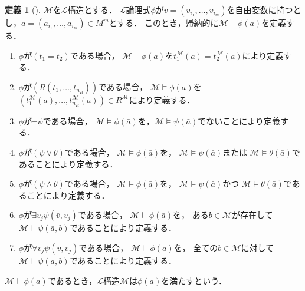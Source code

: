 \documentclass[uplatex, dvipdfmx]{jsarticle}
\numberwithin{equation}{section}
\theoremstyle{definition}
\newtheorem{definition}{定義}[section]
\begin{document}
\begin{definition}[{\cite[Definition 1.1.6]{MR1924282}}]
     $\mathcal{M}$を$\mathcal{L}$構造とする．
     $\mathcal{L}$論理式$\phi$が$\bar{v} = (v_{i_1}, \dots, v_{i_m})$を自由変数に持つとし，$\bar{a} = (a_{i_1}, \dots, a_{i_m}) \in M^m$とする．
     このとき，帰納的に$\mathcal{M} \models \phi(\bar{a})$を定義する．
     \begin{enumerate}
          \item 
               $\phi$が$(t_1=t_2)$である場合，
               $\mathcal{M} \models \phi(\bar{a})$を$t_1^\mathcal{M}(\bar{a}) = t_2^\mathcal{M}(\bar{a})$により定義する．
          \item 
               $\phi$が$(R(t_1, \dots, t_{n_R}))$である場合，
               $\mathcal{M} \models \phi(\bar{a})$を$(t_1^\mathcal{M}(\bar{a}), \dots, t_{n_R}^\mathcal{M}(\bar{a}))\in R^\mathcal{M}$により定義する．
          \item
               $\phi$が$\lnot \psi$である場合，
               $\mathcal{M} \models \phi(\bar{a})$を，$\mathcal{M} \models \psi(\bar{a})$でないことにより定義する．
          \item
               $\phi$が$(\psi \lor \theta)$である場合，
               $\mathcal{M} \models \phi(\bar{a})$を，
               $\mathcal{M} \models \psi(\bar{a})$または
               $\mathcal{M} \models \theta(\bar{a})$であることにより定義する．
          \item
               $\phi$が$(\psi \land \theta)$である場合，
               $\mathcal{M} \models \phi(\bar{a})$を，
               $\mathcal{M} \models \psi(\bar{a})$かつ
               $\mathcal{M} \models \theta(\bar{a})$であることにより定義する．
          \item
               $\phi$が$\exists v_j\psi(\bar{v}, v_j)$である場合，
               $\mathcal{M} \models \phi(\bar{a})$を，
               ある$b \in \mathcal{M}$が存在して
               $\mathcal{M} \models \psi(\bar{a},b)$であることにより定義する．
          \item
          $\phi$が$\forall v_j\psi(\bar{v}, v_j)$である場合，
          $\mathcal{M} \models \phi(\bar{a})$を，
          全ての$b \in \mathcal{M}$に対して
          $\mathcal{M} \models \psi(\bar{a},b)$であることにより定義する．
     \end{enumerate}
     $\mathcal{M} \models \phi(\bar{a})$であるとき，$\mathcal{L}$構造$\mathcal{M}$は$\phi(\bar{a})$を満たすという．
\end{definition}
\end{document}
